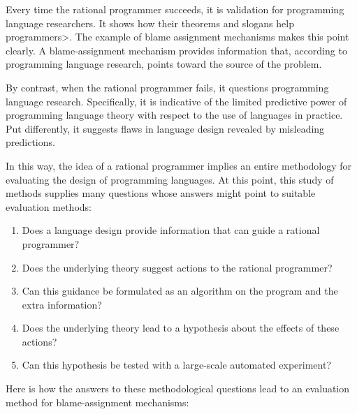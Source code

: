 

Every time the rational programmer succeeds, it is validation for programming
language researchers. It shows how their theorems and slogans help
programmers>. The example of blame assignment mechanisms makes this point
clearly. A blame-assignment mechanism provides information that, according to
programming language research, points toward the source of the problem.

By contrast, when the rational programmer fails, it questions programming
language research. Specifically, it is indicative of the limited predictive
power of programming language theory with respect to the use of languages in
practice. Put differently, it suggests flaws in language design revealed by
misleading predictions.

In this way, the idea of a rational programmer implies an entire methodology for
evaluating the design of programming languages. At this point, this study of
methods supplies many questions whose answers might point to suitable evaluation
methods: 

\begin{enumerate} 

\item Does a language design provide information that can guide a
 rational programmer?

\item Does the underlying theory suggest actions to the rational programmer?

\item Can this guidance be formulated as an algorithm on the program and the extra
information?

\item Does the underlying theory lead to a hypothesis about the effects of
 these actions? 

\item Can this hypothesis be tested with a large-scale automated experiment?

\end{enumerate}

Here is how the answers to these methodological questions lead to an evaluation
method for blame-assignment mechanisms: 

